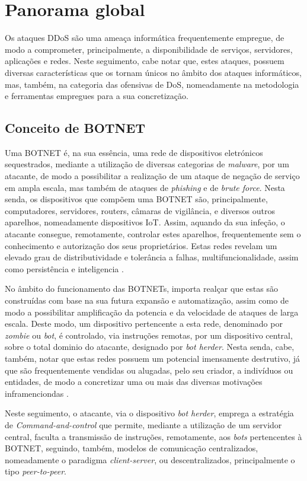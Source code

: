 \section{Panorama global}
Os ataques DDoS são uma ameaça informática frequentemente empregue, de modo a comprometer, principalmente, a disponibilidade de serviços, servidores, aplicações e redes. Neste seguimento, cabe notar que, estes ataques, possuem diversas características que os tornam únicos no âmbito dos ataques informáticos, mas, também, na categoria das ofensivas de DoS, nomeadamente na metodologia e ferramentas empregues para a sua concretização.
\subsection{Conceito de BOTNET}
Uma BOTNET é, na sua essência, uma rede de dispositivos eletrónicos sequestrados, mediante a utilização de diversas categorias de \textit{malware}, por um atacante, de modo a possibilitar a realização de um ataque de negação de serviço em ampla escala, mas também de ataques de \textit{phishing} e de \textit{brute force}. Nesta senda, os dispositivos que compõem uma BOTNET são, principalmente, computadores, servidores, routers, câmaras de vigilância, e diversos outros aparelhos, nomeadamente dispositivos IoT. Assim, aquando da sua infeção, o atacante consegue, remotamente, controlar estes aparelhos, frequentemente sem o conhecimento e autorização dos seus proprietários. Estas redes revelam um elevado grau de distributividade e tolerância a falhas, multifuncionalidade, assim como persistência e inteligencia \cite{kaspersky_botnets_2017, paloaltonetwork_botnets}.

No âmbito do funcionamento das BOTNETs, importa realçar que estas são construídas com base na sua futura expansão e automatização, assim como de modo a possibilitar amplificação da potencia e da velocidade de ataques de larga escala. Deste modo, um dispositivo pertencente a esta rede, denominado por \textit{zombie} ou \textit{bot}, é controlado, via instruções remotas, por um dispositivo central, sobre o total dominio do atacante, designado por \textit{bot herder}. Nesta senda, cabe, também, notar que estas redes possuem um potencial imensamente destrutivo, já que são frequentemente vendidas ou alugadas, pelo seu criador, a indivíduos ou entidades, de modo a concretizar uma ou mais das diversas motivações inframenciondas \cite{kaspersky_botnets_2017, paloaltonetwork_botnets}.

Neste seguimento, o atacante, via o dispositivo \textit{bot herder}, emprega a estratégia de \textit{Command-and-control} que permite, mediante a utilização de um servidor central, faculta a transmissão de instruções, remotamente, aos \textit{bots} pertencentes à BOTNET, seguindo, também, modelos de comunicação centralizados, nomeadamente o paradigma \textit{client-server}, ou descentralizados, principalmente o tipo \textit{peer-to-peer}.

